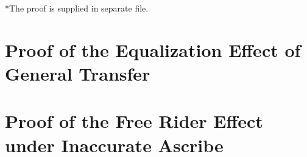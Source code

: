 *The proof is supplied in separate file.
\section{Proof of the Equalization Effect of General Transfer}

\section{Proof of the Free Rider Effect under Inaccurate Ascribe}

